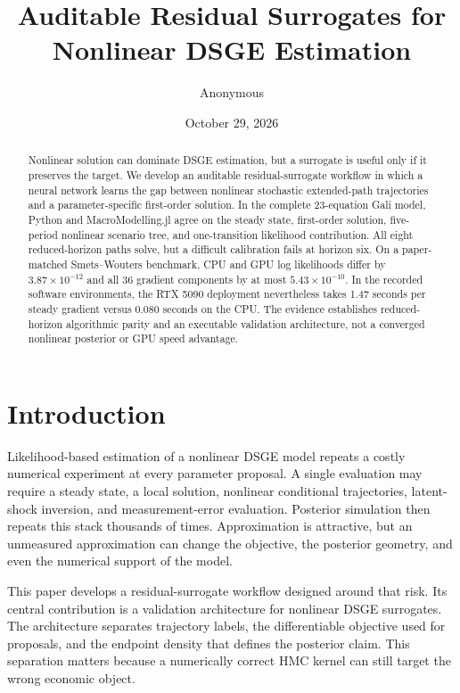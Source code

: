 \documentclass[11pt]{article}
\title{Auditable Residual Surrogates for Nonlinear DSGE Estimation}
\author{Anonymous}
\date{October 29, 2026}
\begin{document}
\maketitle

\begin{abstract}
Nonlinear solution can dominate DSGE estimation, but a surrogate is useful
only if it preserves the target. We develop an auditable residual-surrogate
workflow in which a neural network learns the gap between nonlinear stochastic
extended-path trajectories and a parameter-specific first-order solution. In
the complete 23-equation Gal\'i model, Python and MacroModelling.jl agree on the
steady state, first-order solution, five-period nonlinear scenario tree, and
one-transition likelihood contribution. All eight reduced-horizon paths solve,
but a difficult calibration fails at horizon six. On a paper-matched
Smets--Wouters benchmark, CPU and GPU log likelihoods differ by
$3.87\times10^{-12}$ and all 36 gradient components by at most
$5.43\times10^{-10}$. In the recorded software environments, the RTX 5090
deployment nevertheless takes 1.47 seconds per steady gradient versus 0.080
seconds on the CPU. The evidence establishes
reduced-horizon algorithmic parity and an executable validation architecture,
not a converged nonlinear posterior or GPU speed advantage.
\end{abstract}

\section{Introduction}

Likelihood-based estimation of a nonlinear DSGE model repeats a costly
numerical experiment at every parameter proposal. A single evaluation may
require a steady state, a local solution, nonlinear conditional trajectories,
latent-shock inversion, and measurement-error evaluation. Posterior simulation
then repeats this stack thousands of times. Approximation is attractive, but an
unmeasured approximation can change the objective, the posterior geometry, and
even the numerical support of the model.

This paper develops a residual-surrogate workflow designed around that risk.
Its central contribution is a validation architecture for nonlinear DSGE
surrogates. The architecture separates trajectory labels, the differentiable
objective used for proposals, and the endpoint density that defines the
posterior claim. This separation matters because a numerically correct HMC
kernel can still target the wrong economic object.
\end{document}
